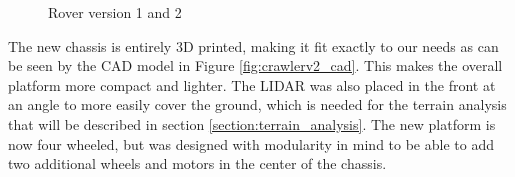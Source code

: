 \documentclass[12pt]{article}
\begin{document}
        \begin{figure}[H]
            \centering 
            \caption{Rover version 1 and 2}
            \label{fig:rover_comparison}
        \end{figure}

        The new chassis is entirely 3D printed, making it fit exactly to our needs as can be seen by the CAD model in Figure \ref{fig:crawlerv2_cad}. This makes the overall platform more compact and lighter. The LIDAR was also placed in the front at an angle to more easily cover the ground, which is needed for the terrain analysis that will be described in section \ref{section:terrain_analysis}. The new platform is now four wheeled, but was designed with modularity in mind to be able to add two additional wheels and motors in the center of the chassis.
\end{document}
